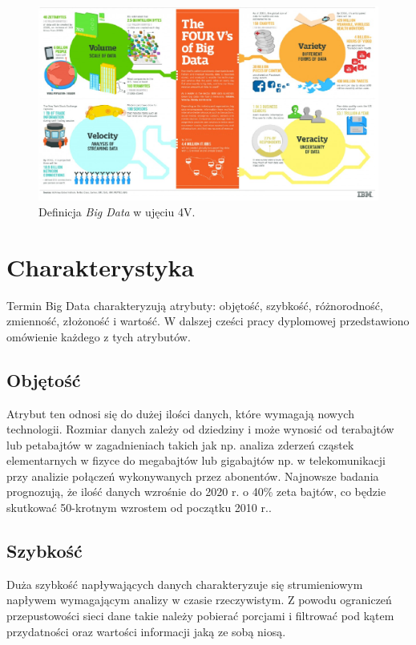 \begin{figure}[h] %
	\centering
	\includegraphics[width=1.0\linewidth]{img/big_data_4_v}
	\caption{Definicja \textit{Big Data} w ujęciu 4V.}
\end{figure}

\section{Charakterystyka}
Termin Big Data charakteryzują atrybuty: objętość, szybkość, różnorodność, zmienność, złożoność i wartość. W dalszej cześci pracy dyplomowej przedstawiono omówienie każdego z tych atrybutów.

\subsection{Objętość}
Atrybut ten odnosi się do dużej ilości danych, które wymagają nowych technologii. Rozmiar danych zależy od dziedziny i może wynosić od terabajtów lub petabajtów w zagadnieniach takich jak np. analiza zderzeń cząstek elementarnych w fizyce do megabajtów lub gigabajtów np. w telekomunikacji przy analizie połączeń wykonywanych przez abonentów. Najnowsze badania prognozują, że ilość danych wzrośnie do 2020 r. o 40\% zeta bajtów, co będzie skutkować 50-krotnym wzrostem od początku 2010 r..

\subsection{Szybkość}
Duża szybkość napływających danych charakteryzuje się strumieniowym napływem wymagającym analizy w czasie rzeczywistym. Z powodu ograniczeń przepustowości sieci dane takie należy pobierać porcjami i filtrować pod kątem przydatności oraz wartości informacji jaką ze sobą niosą.

